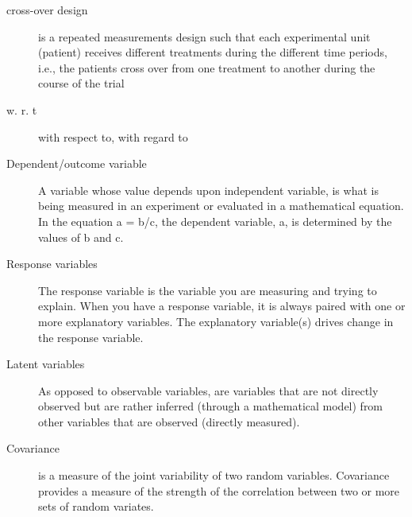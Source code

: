 \documentclass[
]{book}
\begin{document}
\begin{description}
\item[cross-over design]
is a repeated measurements design such that each experimental unit (patient) receives different treatments during the different time periods, i.e., the patients cross over from one treatment to another during the course of the trial
\item[w. r. t]
with respect to, with regard to
\item[Dependent/outcome variable]
A variable whose value depends upon independent variable, is what is being measured in an experiment or evaluated in a mathematical equation. In the equation a = b/c, the dependent variable, a, is determined by the values of b and c.
\item[Response variables]
The response variable is the variable you are measuring and trying to explain. When you have a response variable, it is always paired with one or more explanatory variables. The explanatory variable(s) drives change in the response variable.
\item[Latent variables]
As opposed to observable variables, are variables that are not directly observed but are rather inferred (through a mathematical model) from other variables that are observed (directly measured).
\item[Covariance]
is a measure of the joint variability of two random variables. Covariance provides a measure of the strength of the correlation between two or more sets of random variates.


\end{description}
\end{document}
